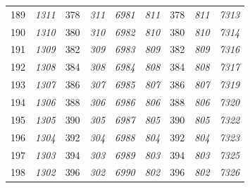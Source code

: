 \documentclass[10pt,fleqn]{article}
\begin{document}
\begin{longtable}{c|cccccccc}
189 & {\color{blue} \it 1311 \rm} & {\color{black} 378} & {\color{blue} \it 311 \rm} & {\color{blue} \it 6981 \rm} & {\color{blue} \it 811 \rm} & {\color{black} 378} & {\color{blue} \it 811 \rm} & {\color{blue} \it 7313 \rm} \\
190 & {\color{blue} \it 1310 \rm} & {\color{black} 380} & {\color{blue} \it 310 \rm} & {\color{blue} \it 6982 \rm} & {\color{blue} \it 810 \rm} & {\color{black} 380} & {\color{blue} \it 810 \rm} & {\color{blue} \it 7314 \rm} \\
191 & {\color{blue} \it 1309 \rm} & {\color{black} 382} & {\color{blue} \it 309 \rm} & {\color{blue} \it 6983 \rm} & {\color{blue} \it 809 \rm} & {\color{black} 382} & {\color{blue} \it 809 \rm} & {\color{blue} \it 7316 \rm} \\
192 & {\color{blue} \it 1308 \rm} & {\color{black} 384} & {\color{blue} \it 308 \rm} & {\color{blue} \it 6984 \rm} & {\color{blue} \it 808 \rm} & {\color{black} 384} & {\color{blue} \it 808 \rm} & {\color{blue} \it 7317 \rm} \\
193 & {\color{blue} \it 1307 \rm} & {\color{black} 386} & {\color{blue} \it 307 \rm} & {\color{blue} \it 6985 \rm} & {\color{blue} \it 807 \rm} & {\color{black} 386} & {\color{blue} \it 807 \rm} & {\color{blue} \it 7319 \rm} \\
194 & {\color{blue} \it 1306 \rm} & {\color{black} 388} & {\color{blue} \it 306 \rm} & {\color{blue} \it 6986 \rm} & {\color{blue} \it 806 \rm} & {\color{black} 388} & {\color{blue} \it 806 \rm} & {\color{blue} \it 7320 \rm} \\
195 & {\color{blue} \it 1305 \rm} & {\color{black} 390} & {\color{blue} \it 305 \rm} & {\color{blue} \it 6987 \rm} & {\color{blue} \it 805 \rm} & {\color{black} 390} & {\color{blue} \it 805 \rm} & {\color{blue} \it 7322 \rm} \\
196 & {\color{blue} \it 1304 \rm} & {\color{black} 392} & {\color{blue} \it 304 \rm} & {\color{blue} \it 6988 \rm} & {\color{blue} \it 804 \rm} & {\color{black} 392} & {\color{blue} \it 804 \rm} & {\color{blue} \it 7323 \rm} \\
197 & {\color{blue} \it 1303 \rm} & {\color{black} 394} & {\color{blue} \it 303 \rm} & {\color{blue} \it 6989 \rm} & {\color{blue} \it 803 \rm} & {\color{black} 394} & {\color{blue} \it 803 \rm} & {\color{blue} \it 7325 \rm} \\
198 & {\color{blue} \it 1302 \rm} & {\color{black} 396} & {\color{blue} \it 302 \rm} & {\color{blue} \it 6990 \rm} & {\color{blue} \it 802 \rm} & {\color{black} 396} & {\color{blue} \it 802 \rm} & {\color{blue} \it 7326 \rm} \\

\end{longtable}
\end{document}
